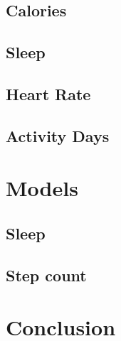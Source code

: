 \documentclass{report}
\begin{document}
\subsection{Calories}
\subsection{Sleep}
\subsection{Heart Rate}
\subsection{Activity Days}

\section{Models}
\subsection{Sleep}
\subsection{Step count}

\section{Conclusion}



 
 
\end{document}
